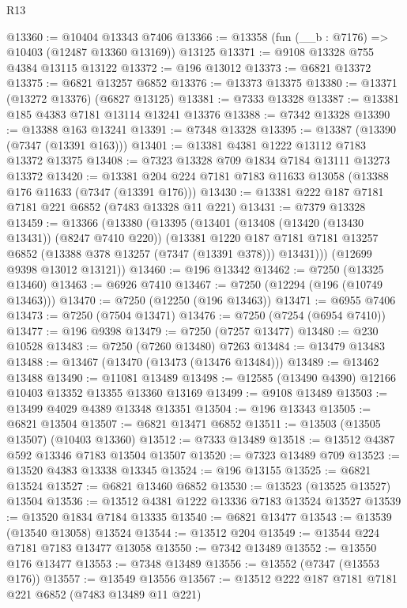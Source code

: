 \begin{lexlean}{R13}
\begin{coremodule}
@13360 := @10404 @13343 @7406
@13366 := @13358 (fun (__b : @7176) => @10403 (@12487 @13360 @13169)) @13125
@13371 := @9108 @13328 @755 @4384 @13115 @13122
@13372 := @196 @13012
@13373 := @6821 @13372
@13375 := @6821 @13257 @6852
@13376 := @13373 @13375
@13380 := @13371 (@13272 @13376) (@6827 @13125)
@13381 := @7333 @13328
@13387 := @13381 @185 @4383 @7181 @13114 @13241 @13376
@13388 := @7342 @13328
@13390 := @13388 @163 @13241
@13391 := @7348 @13328
@13395 := @13387 (@13390 (@7347 (@13391 @163)))
@13401 := @13381 @4381 @1222 @13112 @7183 @13372 @13375
@13408 := @7323 @13328 @709 @1834 @7184 @13111 @13273 @13372
@13420 := @13381 @204 @224 @7181 @7183 @11633 @13058 (@13388 @176 @11633 (@7347 (@13391 @176)))
@13430 := @13381 @222 @187 @7181 @7181 @221 @6852 (@7483 @13328 @11 @221)
@13431 := @7379 @13328
@13459 := @13366
    (@13380
      (@13395
        (@13401
          (@13408 (@13420 (@13430 @13431)) (@8247 @7410 @220))
          (@13381
            @1220
            @187
            @7181
            @7181
            @13257
            @6852
            (@13388 @378 @13257 (@7347 (@13391 @378)))
            @13431)))
      (@12699 @9398 @13012 @13121))
@13460 := @196 @13342
@13462 := @7250 (@13325 @13460)
@13463 := @6926 @7410
@13467 := @7250 (@12294 (@196 (@10749 @13463)))
@13470 := @7250 (@12250 (@196 @13463))
@13471 := @6955 @7406
@13473 := @7250 (@7504 @13471)
@13476 := @7250 (@7254 (@6954 @7410))
@13477 := @196 @9398
@13479 := @7250 (@7257 @13477)
@13480 := @230 @10528
@13483 := @7250 (@7260 @13480) @7263
@13484 := @13479 @13483
@13488 := @13467 (@13470 (@13473 (@13476 @13484)))
@13489 := @13462 @13488
@13490 := @11081 @13489
@13498 := @12585 (@13490 @4390) @12166 @10403 @13352 @13355 @13360 @13169
@13499 := @9108 @13489
@13503 := @13499 @4029 @4389 @13348 @13351
@13504 := @196 @13343
@13505 := @6821 @13504
@13507 := @6821 @13471 @6852
@13511 := @13503 (@13505 @13507) (@10403 @13360)
@13512 := @7333 @13489
@13518 := @13512 @4387 @592 @13346 @7183 @13504 @13507
@13520 := @7323 @13489 @709
@13523 := @13520 @4383 @13338 @13345
@13524 := @196 @13155
@13525 := @6821 @13524
@13527 := @6821 @13460 @6852
@13530 := @13523 (@13525 @13527) @13504
@13536 := @13512 @4381 @1222 @13336 @7183 @13524 @13527
@13539 := @13520 @1834 @7184 @13335
@13540 := @6821 @13477
@13543 := @13539 (@13540 @13058) @13524
@13544 := @13512 @204
@13549 := @13544 @224 @7181 @7183 @13477 @13058
@13550 := @7342 @13489
@13552 := @13550 @176 @13477
@13553 := @7348 @13489
@13556 := @13552 (@7347 (@13553 @176))
@13557 := @13549 @13556
@13567 := @13512 @222 @187 @7181 @7181 @221 @6852 (@7483 @13489 @11 @221)

\end{coremodule}
\end{lexlean}
